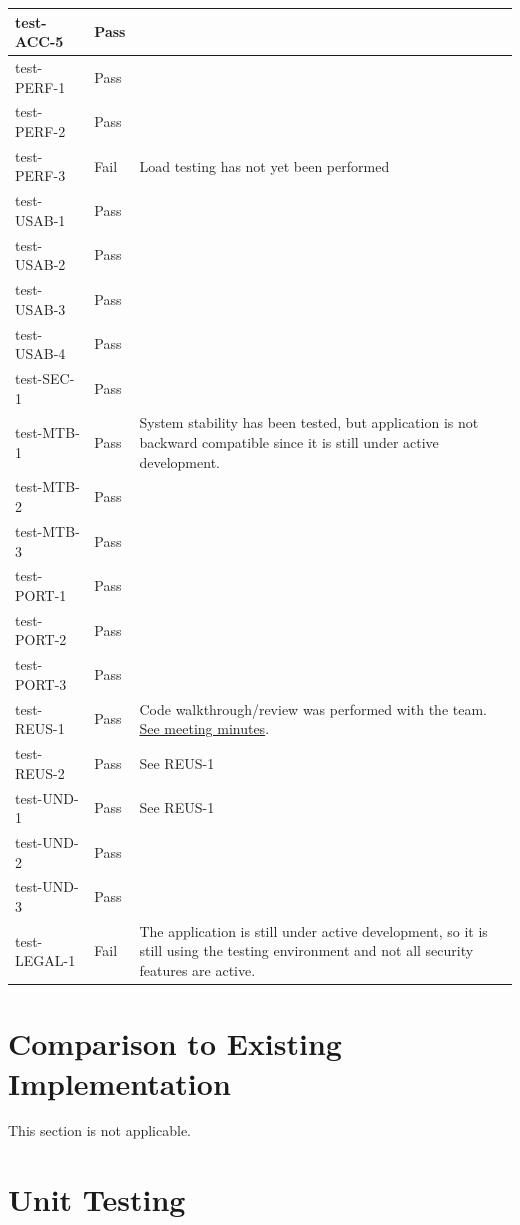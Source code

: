 \documentclass[12pt, titlepage]{article}
\begin{document}
\begin{longtable}{>{\centering\arraybackslash}p{} >{\centering\arraybackslash}p{} >{\centering\arraybackslash}p{}}
    test-ACC-5 & Pass &  \\
    \midrule
    test-PERF-1 & Pass &  \\
    test-PERF-2 & Pass &  \\
    test-PERF-3 & Fail & Load testing has not yet been performed \\
    \midrule
    test-USAB-1 & Pass &  \\
    test-USAB-2 & Pass &  \\
    test-USAB-3 & Pass &  \\
    test-USAB-4 & Pass &  \\
    \midrule
    test-SEC-1 & Pass &  \\
    \midrule
    test-MTB-1 & Pass & System stability has been tested, but application is not
    backward compatible since it is still under active development. \\
    test-MTB-2 & Pass &  \\
    test-MTB-3 & Pass &  \\
    \midrule
    test-PORT-1 & Pass &  \\
    test-PORT-2 & Pass &  \\
    test-PORT-3 & Pass &  \\
    \midrule
    test-REUS-1 & Pass & Code walkthrough/review was performed with the team.
    \href{https://github.com/PlutosCapstone/Plutos/issues/256}{See meeting
    minutes}. \\
    test-REUS-2 & Pass & See REUS-1 \\
    \midrule
    test-UND-1 & Pass & See REUS-1 \\
    test-UND-2 & Pass &  \\
    test-UND-3 & Pass &  \\
    \midrule
    test-LEGAL-1 & Fail & The application is still under active development, so
    it is still using the testing environment and not all security features are
    active. \\
    \bottomrule
\end{longtable}


	
\section{Comparison to Existing Implementation}	

This section is not applicable.

\section{Unit Testing}
\end{document}
